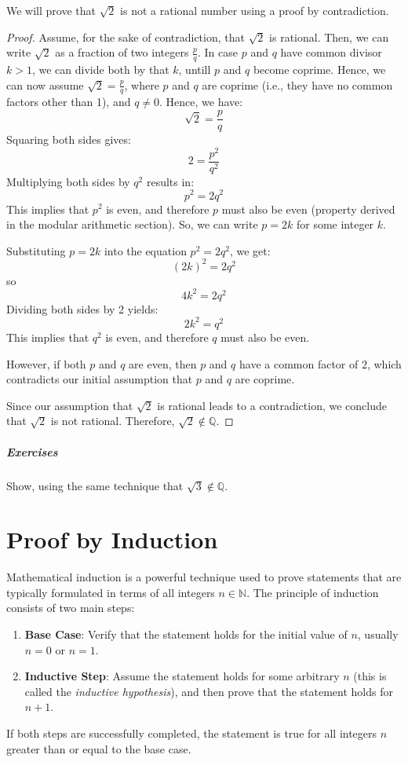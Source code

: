 \documentclass[]{article}
\newcommand{\N}{\mathbb{N}}
\begin{document}
	We will prove that $\sqrt{2}$ is not a rational number using a proof by contradiction.
	
	\begin{proof}
		Assume, for the sake of contradiction, that $\sqrt{2}$ is rational. Then, we can write $\sqrt{2}$ as a fraction of two integers $\frac{p}{q}$.
		In case $p$ and $q$ have common divisor $k > 1$, we can divide both by that $k$, untill $p$ and $q$ become coprime.
		Hence, we can now assume $\sqrt{2} = \frac{p}{q}$, where $p$ and $q$ are coprime (i.e., they have no common factors other than 1), and $q \neq 0$.
		Hence, we have:
		$$ \sqrt{2} = \frac{p}{q} $$
		Squaring both sides gives:
		$$ 2 = \frac{p^2}{q^2} $$
		Multiplying both sides by $q^2$ results in:
		$$ p^2 = 2q^2 $$
		This implies that $p^2$ is even, and therefore $p$ must also be even (property derived in the modular arithmetic section).
		So, we can write $p = 2k$ for some integer $k$.
		
		Substituting $p = 2k$ into the equation $p^2 = 2q^2$, we get:
		$$ (2k)^2 = 2q^2 $$
		so $$ 4k^2 = 2q^2 $$
		Dividing both sides by 2 yields:
		$$ 2k^2 = q^2 $$
		This implies that $q^2$ is even, and therefore $q$ must also be even.
		
		However, if both $p$ and $q$ are even, then $p$ and $q$ have a common factor of 2, which contradicts our initial assumption that $p$ and $q$ are coprime.
		
		Since our assumption that $\sqrt{2}$ is rational leads to a contradiction, we conclude that $\sqrt{2}$ is not rational.
		Therefore, $\sqrt{2} \not\in \mathbb{Q}$.
	\end{proof}
	
	\subparagraph{Exercises}
	Show, using the same technique that $\sqrt{3} \not\in \mathbb{Q}$.
	
	\vspace{3cm}
	\section*{Proof by Induction}
	Mathematical induction is a powerful technique used to prove statements that are typically formulated in terms of all integers $n \in \N$.
	The principle of induction consists of two main steps:
	\begin{enumerate}
		\item \textbf{Base Case}: Verify that the statement holds for the initial value of $n$, usually $n = 0$ or $n = 1$.
		\item \textbf{Inductive Step}: Assume the statement holds for some arbitrary $n$ (this is called the \emph{inductive hypothesis}), and then prove that the statement holds for $n + 1$.
	\end{enumerate}
	If both steps are successfully completed, the statement is true for all integers $n$ greater than or equal to the base case.
	
\end{document}
